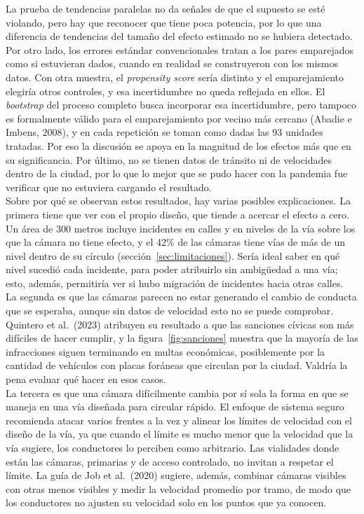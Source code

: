 La prueba de tendencias paralelas no da señales de que el supuesto se esté violando, pero hay que reconocer que tiene poca potencia, por lo que una diferencia de tendencias del tamaño del efecto estimado no se hubiera detectado. Por otro lado, los errores estándar convencionales tratan a los pares emparejados como si estuvieran dados, cuando en realidad se construyeron con los mismos datos. Con otra muestra, el \emph{propensity score} sería distinto y el emparejamiento elegiría otros controles, y esa incertidumbre no queda reflejada en ellos. El \emph{bootstrap} del proceso completo busca incorporar esa incertidumbre, pero tampoco es formalmente válido para el emparejamiento por vecino más cercano (Abadie e Imbens, 2008), y en cada repetición se toman como dadas las 93 unidades tratadas. Por eso la discusión se apoya en la magnitud de los efectos más que en su significancia. Por último, no se tienen datos de tránsito ni de velocidades dentro de la ciudad, por lo que lo mejor que se pudo hacer con la pandemia fue verificar que no estuviera cargando el resultado.\\

Sobre por qué se observan estos resultados, hay varias posibles explicaciones. La primera tiene que ver con el propio diseño, que tiende a acercar el efecto a cero. Un área de 300 metros incluye incidentes en calles y en niveles de la vía sobre los que la cámara no tiene efecto, y el 42\% de las cámaras tiene vías de más de un nivel dentro de su círculo (sección~\ref{sec:limitaciones}). Sería ideal saber en qué nivel sucedió cada incidente, para poder atribuirlo sin ambigüedad a una vía; esto, además, permitiría ver si hubo migración de incidentes hacia otras calles.\\

La segunda es que las cámaras parecen no estar generando el cambio de conducta que se esperaba, aunque sin datos de velocidad esto no se puede comprobar. Quintero et al.\ (2023) atribuyen su resultado a que las sanciones cívicas son más difíciles de hacer cumplir, y la figura~\ref{fig:sanciones} muestra que la mayoría de las infracciones siguen terminando en multas económicas, posiblemente por la cantidad de vehículos con placas foráneas que circulan por la ciudad. Valdría la pena evaluar qué hacer en esos casos.\\

La tercera es que una cámara difícilmente cambia por sí sola la forma en que se maneja en una vía diseñada para circular rápido. El enfoque de sistema seguro recomienda atacar varios frentes a la vez y alinear los límites de velocidad con el diseño de la vía, ya que cuando el límite es mucho menor que la velocidad que la vía sugiere, los conductores lo perciben como arbitrario. Las vialidades donde están las cámaras, primarias y de acceso controlado, no invitan a respetar el límite. La guía de Job et al.\ (2020) sugiere, además, combinar cámaras visibles con otras menos visibles y medir la velocidad promedio por tramo, de modo que los conductores no ajusten su velocidad solo en los puntos que ya conocen.\\

